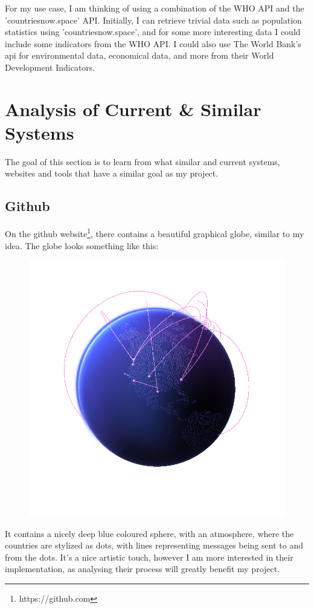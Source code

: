 For my use case, I am thinking of using a combination of the WHO API and the 'countriesnow.space' API. Initially, I can retrieve trivial data such as population statistics using 'countriesnow.space', and for some more interesting data I could include some indicators from the WHO API. I could also use The World Bank's api for environmental data, economical data, and more from their World Development Indicators.

\newpage

\section{Analysis of Current \& Similar Systems}
The goal of this section is to learn from what similar and current systems, websites and tools that have a similar goal as my project.
\subsection{Github}
On the github website\footnote{https://github.com}, there contains a beautiful graphical globe, similar to my idea.
The globe looks something like this:
\begin{figure}[h]
\centering
\includegraphics[width=0.7\linewidth]{images/screenshot001}
\caption{}
\label{fig:screenshot001}
\end{figure}
It contains a nicely deep blue coloured sphere, with an atmosphere, where the countries are stylized as dots, with lines representing messages being sent to and from the dots. It's a nice artistic touch, however I am more interested in their implementation, as analysing their process will greatly benefit my project. \\
